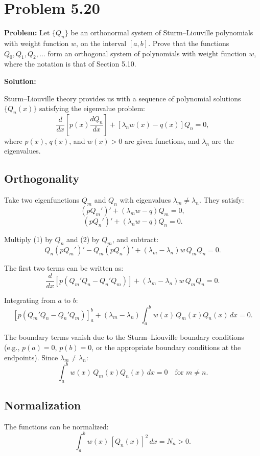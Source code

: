 \documentclass[12pt]{article}
\begin{document}
\section*{Problem 5.20}

\textbf{Problem:} Let $\{Q_n\}$ be an orthonormal system of Sturm--Liouville polynomials with weight function $w$, on the interval $[a,b]$. Prove that the functions $Q_0, Q_1, Q_2, \ldots$ form an orthogonal system of polynomials with weight function $w$, where the notation is that of Section 5.10.

\bigskip
\textbf{Solution:}

Sturm--Liouville theory provides us with a sequence of polynomial solutions $\{Q_n(x)\}$ satisfying the eigenvalue problem:
\[
\frac{d}{dx}\left[p(x)\frac{dQ_n}{dx}\right] + [\lambda_n w(x) - q(x)]Q_n = 0,
\]
where $p(x)$, $q(x)$, and $w(x) > 0$ are given functions, and $\lambda_n$ are the eigenvalues.

\subsection*{Orthogonality}

Take two eigenfunctions $Q_m$ and $Q_n$ with eigenvalues $\lambda_m \neq \lambda_n$. They satisfy:
\[
(pQ_m')' + (\lambda_m w - q)Q_m = 0, \tag{1}
\]
\[
(pQ_n')' + (\lambda_n w - q)Q_n = 0. \tag{2}
\]

Multiply (1) by $Q_n$ and (2) by $Q_m$, and subtract:
\[
Q_n(pQ_m')' - Q_m(pQ_n')' + (\lambda_m - \lambda_n)w\,Q_m Q_n = 0.
\]

The first two terms can be written as:
\[
\frac{d}{dx}\left[p(Q_m'Q_n - Q_n'Q_m)\right] + (\lambda_m - \lambda_n)w\,Q_mQ_n = 0.
\]

Integrating from $a$ to $b$:
\[
\left[p(Q_m'Q_n - Q_n'Q_m)\right]_a^b + (\lambda_m - \lambda_n)\int_a^b w(x)\,Q_m(x)Q_n(x)\,dx = 0.
\]

The boundary terms vanish due to the Sturm--Liouville boundary conditions (e.g., $p(a) = 0$, $p(b) = 0$, or the appropriate boundary conditions at the endpoints). Since $\lambda_m \neq \lambda_n$:
\[
\int_a^b w(x)\,Q_m(x)Q_n(x)\,dx = 0 \quad \text{for } m \neq n.
\]

\subsection*{Normalization}

The functions can be normalized:
\[
\int_a^b w(x)\,[Q_n(x)]^2\,dx = N_n > 0.
\]
\end{document}
